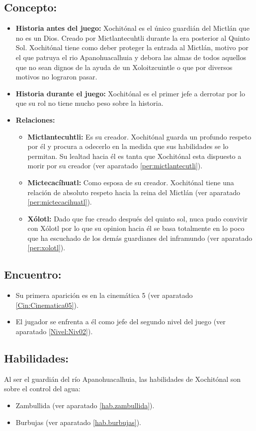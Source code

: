 \subsection{Concepto:}
\begin{itemize}
	\item \textbf{Historia antes del juego:}
	Xochitónal es el único guardián del Mictlán que no es un Dios. Creado por Mictlantecuhtli durante la era posterior al Quinto Sol. Xochitónal tiene como deber proteger la entrada al Mictlán, motivo por el que patruya el rio Apanohuacalhuia y debora las almas de todos aquellos que no sean dignos de la ayuda de un Xoloitzcuintle o que por diversos motivos no lograron pasar.
	\item \textbf{Historia durante el juego:}
	Xochitónal es el primer jefe a derrotar por lo que su rol no tiene mucho peso sobre la historia.
	\item \textbf{Relaciones:}
	\begin{itemize}
		\item \textbf{Mictlantecuhtli:} Es su creador. Xochitónal guarda un profundo respeto por él y procura a odecerlo en la medida que sus habilidades se lo permitan. Su lealtad hacia él es tanta que Xochitónal esta dispuesto a morir por su creador (ver aparatado \ref{per:mictlantecutli}). 
		\item \textbf{Mictecacíhuatl:} Como esposa de su creador. Xochitónal tiene una relación de absoluto respeto hacia la reina del Mictlán (ver aparatado \ref{per:mictecacihuatl}). 
		\item \textbf{Xólotl:} Dado que fue creado después del quinto sol, nuca pudo convivir con Xólotl por lo que su opinion hacia él se basa totalmente en lo poco que ha escuchado de los demás guardianes del inframundo (ver aparatado \ref{per:xolotl}).
	\end{itemize}			  
\end{itemize} 
\subsection{Encuentro:}
\begin{itemize}
	\item Su primera aparición es en la cinemática 5 (ver aparatado \ref{Cin:Cinematica05}). 
	\item El jugador se enfrenta a él como jefe del segundo nivel del juego (ver aparatado \ref{Nivel:Niv02}).
\end{itemize}
\subsection{Habilidades:}
Al ser el guardián del río  Apanohuacalhuia, las habilidades de Xochitónal son sobre el control del agua:
\begin{itemize}
	\item Zambullida (ver aparatado \ref{hab.zambullida}).  
	\item Burbujas (ver aparatado \ref{hab.burbujas}).
\end{itemize}
